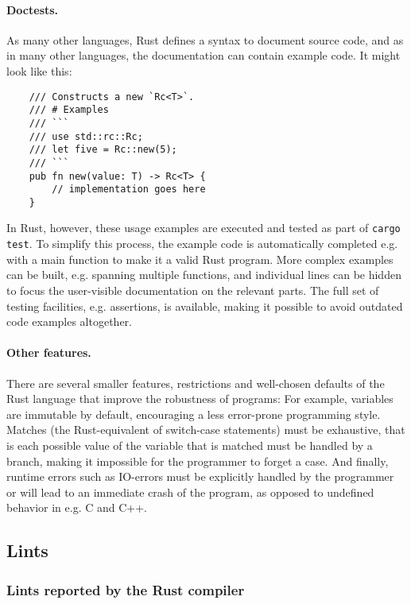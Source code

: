 \documentclass{scrartcl}
\begin{document}
\paragraph{Doctests.} As many other languages, Rust defines a syntax to document source code, and as in many other languages, the documentation can contain example code. It might look like this:

\small {
    \begin{verbatim}
    /// Constructs a new `Rc<T>`.
    /// # Examples
    /// ```
    /// use std::rc::Rc;
    /// let five = Rc::new(5);
    /// ```
    pub fn new(value: T) -> Rc<T> {
        // implementation goes here
    }
    \end{verbatim}
}

In Rust, however, these usage examples are executed and tested as part of \texttt{cargo test}. To simplify this process, the example code is automatically completed e.g. with a main function to make it a valid Rust program. More complex examples can be built, e.g. spanning multiple functions, and individual lines can be hidden to focus the user-visible documentation on the relevant parts. The full set of testing facilities, e.g. assertions, is available, making it possible to avoid outdated code examples altogether.

\paragraph{Other features.} There are several smaller features, restrictions and well-chosen defaults of the Rust language that improve the robustness of programs: For example, variables are immutable by default, encouraging a less error-prone programming style. Matches (the Rust-equivalent of switch-case statements) must be exhaustive, that is each possible value of the variable that is matched must be handled by a branch, making it impossible for the programmer to forget a case. And finally, runtime errors such as IO-errors must be explicitly handled by the programmer or will lead to an immediate crash of the program, as opposed to undefined behavior in e.g. C and C++.





\subsection{Lints}


\subsubsection{Lints reported by the Rust compiler}
\end{document}
